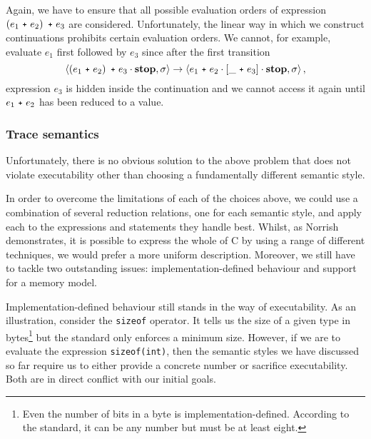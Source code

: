 \documentclass[a4paper,12pt]{scrbook}
\theoremstyle{plain}
\theoremstyle{definition}
\newcommand{\cc}[1]{{\text{\footnotesize\ttfamily{#1}}}}
\newcommand{\comp}[0]{\cdot}
\begin{document}
Again, we have to ensure that all possible evaluation orders of expression
$\left( e_1 ~\cc{+}~ e_2 \right) ~\cc{+}~ e_3$ are considered. Unfortunately,
the linear way in which we construct continuations prohibits certain evaluation
orders. We cannot, for example, evaluate $e_1$ first followed by $e_3$ since
after the first transition
\begin{equation*}
\left< \left( e_1 ~\cc{+}~ e_2 \right) ~\cc{+}~ e_3 \comp \textbf{stop},
       \sigma \right>
\rightarrow
\left< e_1 ~\cc{+}~ e_2 \comp \left[ \_ ~\cc{+}~ e_3 \right] \comp \textbf{stop},
       \sigma \right>,
\end{equation*}
expression $e_3$ is hidden inside the continuation and we cannot access it again
until $e_1 ~\cc{+}~ e_2$ has been reduced to a value.

\subsubsection{Trace semantics}\label{traceSemantics}
Unfortunately, there is no obvious solution to the above problem that does not
violate executability other than choosing a fundamentally different semantic
style.

In order to overcome the limitations of each of the choices above, we could use
a combination of several reduction relations, one for each semantic style, and
apply each to the expressions and statements they handle best. Whilst, as
Norrish \cite{norrishPhd} demonstrates, it is possible to express the whole of C
by using a range of different techniques, we would prefer a more uniform
description. Moreover, we still have to tackle two outstanding issues:
implementation-defined behaviour and support for a memory model.

Implementation-defined behaviour still stands in the way of executability. As an
illustration, consider the \lstinline{sizeof} operator. It tells us the size of
a given type in bytes\footnote{Even the number of bits in a byte is
  implementation-defined. According to the standard, it can be any number but
  must be at least eight.} but the standard only enforces a minimum
size. However, if we are to evaluate the expression \lstinline{sizeof(int)},
then the semantic styles we have discussed so far require us to either provide a
concrete number or sacrifice executability. Both are in direct conflict with our
initial goals.
\end{document}
